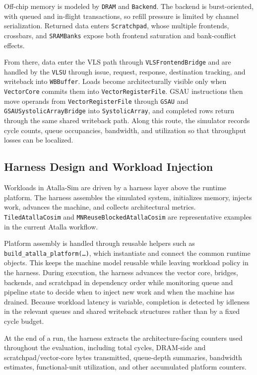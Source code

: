 Off-chip memory is modeled by \texttt{DRAM} and \texttt{Backend}. The backend is burst-oriented, with queued and in-flight transactions, so refill pressure is limited by channel serialization. Returned data enters \texttt{Scratchpad}, whose multiple frontends, crossbars, and \texttt{SRAMBanks} expose both frontend saturation and bank-conflict effects.

From there, data enter the VLS path through \texttt{VLSFrontendBridge} and are handled by the \texttt{VLSU} through issue, request, response, destination tracking, and writeback into \texttt{WBBuffer}. Loads become architecturally visible only when \texttt{VectorCore} commits them into \texttt{VectorRegisterFile}. GSAU instructions then move operands from \texttt{VectorRegisterFile} through \texttt{GSAU} and \texttt{GSAUSystolicArrayBridge} into \texttt{SystolicArray}, and completed rows return through the same shared writeback path. Along this route, the simulator records cycle counts, queue occupancies, bandwidth, and utilization so that throughput losses can be localized.

\subsection{Harness Design and Workload Injection}
Workloads in Atalla-Sim are driven by a harness layer above the runtime platform. The harness assembles the simulated system, initializes memory, injects work, advances the machine, and collects architectural metrics. \texttt{TiledAtallaCosim} and \texttt{MNReuseBlockedAtallaCosim} are representative examples in the current Atalla workflow.

Platform assembly is handled through reusable helpers such as \texttt{build\_atalla\_platform(\ldots)}, which instantiate and connect the common runtime objects. This keeps the machine model reusable while leaving workload policy in the harness. During execution, the harness advances the vector core, bridges, backends, and scratchpad in dependency order while monitoring queue and pipeline state to decide when to inject new work and when the machine has drained. Because workload latency is variable, completion is detected by idleness in the relevant queues and shared writeback structures rather than by a fixed cycle budget.

At the end of a run, the harness extracts the architecture-facing counters used throughout the evaluation, including total cycles, DRAM-side and scratchpad/vector-core bytes transmitted, queue-depth summaries, bandwidth estimates, functional-unit utilization, and other accumulated platform counters.